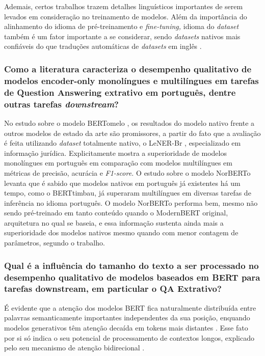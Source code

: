 \documentclass[12pt,a4paper]{article}
\begin{document}
Ademais, certos trabalhos trazem detalhes linguísticos importantes de serem levados em consideração no treinamento de modelos. Além da importância do alinhamento do idioma de pré-treinamento e \textit{fine-tuning,} idioma do \textit{dataset} também é um fator importante a se considerar, sendo \textit{datasets} nativos mais confiáveis do que traduções automáticas de \textit{datasets} em inglês \cite{ambala}.

\subsubsection{Como a literatura caracteriza o desempenho qualitativo de modelos encoder-only monolíngues e multilíngues em tarefas de Question Answering extrativo em português, dentre outras tarefas \textit{downstream}?}

No estudo sobre o modelo BERTomelo \cite{bertomelo}, os resultados do modelo nativo frente a outros modelos de estado da arte são promissores, a partir do fato que a avaliação é feita utilizando \textit{dataset} totalmente nativo, o LeNER-Br \cite{lener}, especializado em informação jurídica. Explicitamente mostra a superioridade de modelos monolíngues em português em comparação com modelos multilíngues em métricas de precisão, acurácia e \textit{F1-score.} O estudo sobre o modelo NorBERTo \cite{norberto} levanta que é sabido que modelos nativos em português já existentes há um tempo, como o BERTtimbau, já superaram multilíngues em diversas tarefas de inferência no idioma português. O modelo NorBERTo performa bem, mesmo não sendo pré-treinado em tanto conteúdo quando o ModernBERT original, arquitetura no qual se baseia, e essa informação sustenta ainda mais a superioridade dos modelos nativos mesmo quando com menor contagem de parâmetros, segundo o trabalho.

\subsubsection{Qual é a influência do tamanho do texto a ser processado no desempenho qualitativo de modelos baseados em BERT para tarefas downstream, em particular o QA Extrativo?}

É evidente que a atenção dos modelos BERT fica naturalmente distribuída entre palavras semanticamente importantes independentes da sua posição, enquando modelos generativos têm atenção decaída em tokens mais distantes \cite{deshpande}. Esse fato por si só indica o seu potencial de processamento de contextos longos, explicado pelo seu mecanismo de atenção bidirecional \cite{tiwari}.
\end{document}
